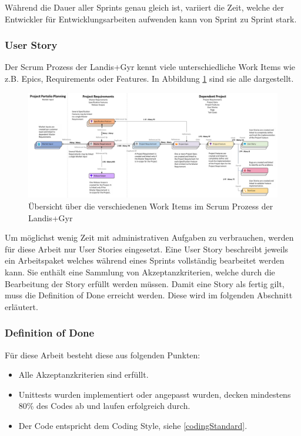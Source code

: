 Während die Dauer aller Sprints genau gleich ist, variiert die Zeit, welche der Entwickler für Entwicklungsarbeiten aufwenden kann von Sprint zu Sprint stark.

\subsubsection{User Story}\label{userstory}
Der Scrum Prozess der Landis+Gyr kennt viele unterschiedliche Work Items wie z.B. Epics, Requirements oder Features.
In Abbildung \ref{fig:workitems} sind sie alle dargestellt.
\begin{figure}[H]
   \centering
   \includegraphics[width=1.0\textwidth]{gfx/WorkItemRelationsship.png}
   \caption{
      Übersicht über die verschiedenen Work Items im Scrum Prozess der Landis+Gyr
      }
      \label{fig:workitems}
\end{figure}
Um möglichst wenig Zeit mit administrativen Aufgaben zu verbrauchen, werden für diese Arbeit nur User Stories eingesetzt.
Eine User Story beschreibt jeweils ein Arbeitspaket welches während eines Sprints vollständig bearbeitet werden kann.
Sie enthält eine Sammlung von Akzeptanzkriterien, welche durch die Bearbeitung der Story erfüllt werden müssen.
Damit eine Story als fertig gilt, muss die Definition of Done erreicht werden. Diese wird im folgenden Abschnitt erläutert.


\subsubsection{Definition of Done}
Für diese Arbeit besteht diese aus folgenden Punkten:
\begin{itemize}
   \item Alle Akzeptanzkriterien sind erfüllt.
   \item Unittests wurden implementiert oder angepasst wurden, decken mindestens 80\% des Codes ab und laufen erfolgreich durch.
   \item Der Code entspricht dem Coding Style, siehe \ref{codingStandard}.
\end{itemize}

